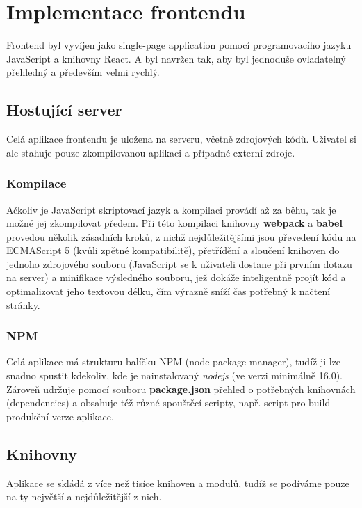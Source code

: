 \chapter{Implementace frontendu}
Frontend byl vyvíjen jako single-page application pomocí programovacího jazyku JavaScript a knihovny React.
A byl navržen tak, aby byl jednoduše ovladatelný přehledný a především velmi rychlý.

\section{Hostující server}
Celá aplikace frontendu je uložena na serveru, včetně zdrojových kódů.
Uživatel si ale stahuje pouze zkompilovanou aplikaci a případné externí zdroje.
\subsection{Kompilace}
Ačkoliv je JavaScript skriptovací jazyk a kompilaci provádí až za běhu, tak je možné
jej zkompilovat předem. Při této kompilaci knihovny \textbf{webpack} a
\textbf{babel} provedou několik zásadních kroků, z nichž nejdůležitějšími jsou
převedení kódu na ECMAScript 5 (kvůli zpětné kompatibilitě), přetřídění a sloučení
knihoven do jednoho zdrojového souboru (JavaScript se k uživateli dostane při prvním dotazu na server) a
minifikace výsledného souboru, jež dokáže inteligentně projít kód a optimalizovat jeho textovou délku,
čím výrazně sníží čas potřebný k načtení stránky.

\subsection{NPM}
Celá aplikace má strukturu balíčku NPM (node package manager), tudíž ji lze snadno
spustit kdekoliv, kde je nainstalovaný \textit{nodejs} (ve verzi minimálně 16.0).
Zároveň udržuje pomocí souboru \textbf{package.json} přehled o potřebných knihovnách (dependencies) a
obsahuje též různé spouštěcí scripty, např. script pro build produkční verze aplikace.

\section{Knihovny}
Aplikace se skládá z více než tisíce knihoven a modulů, tudíž se podíváme
pouze na ty největší a nejdůležitější z nich.

